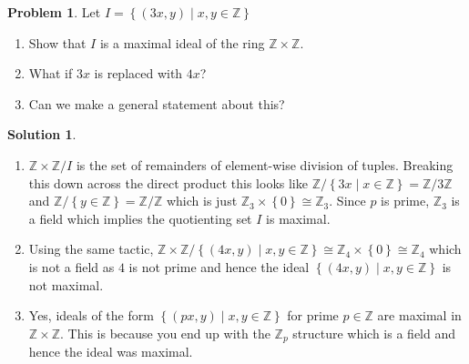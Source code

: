 \documentclass[10pt]{article}
\theoremstyle{definition}
\newtheorem{problem}{Problem}
\newtheorem{soln}{Solution}
\begin{document}
\begin{problem} Let
$I = \left\{(3x, y)\mid x,y \in\mathbb{Z}\right\}$
\begin{enumerate}[label=(\alph*)]
  \item Show that $I$ is a maximal ideal of the ring $\mathbb{Z}\times \mathbb{Z}$.
  \item What if $3x$ is replaced with $4x$?
  \item Can we make a general statement about this?
\end{enumerate}
\end{problem}
\begin{soln}~
  \begin{enumerate}[label=(\alph*)]
    \item $\mathbb{Z}\times \mathbb{Z}/I$ is the set of remainders of element-wise division of tuples. Breaking this down across the direct product
          this looks like $\mathbb{Z}/\left\{3x\mid x\in\mathbb{Z}\right\}=\mathbb{Z}/3\mathbb{Z}$ and $\mathbb{Z}/\left\{y\in\mathbb{Z}\right\}=\mathbb{Z}/\mathbb{Z}$
          which is just $\mathbb{Z}_3\times \left\{0\right\}\cong \mathbb{Z}_3$. Since $p$ is prime, $\mathbb{Z}_3$ is a field which implies the quotienting
          set $I$ is maximal.
    \item Using the same tactic, $\mathbb{Z}\times \mathbb{Z}/\left\{(4x, y)\mid x,y\in\mathbb{Z}\right\}\cong \mathbb{Z}_4\times \left\{0\right\}\cong \mathbb{Z}_4$
          which is not a field as $4$ is not prime and hence the ideal $\left\{(4x, y)\mid x,y\in\mathbb{Z}\right\}$ is not maximal.
    \item Yes, ideals of the form $\left\{(px, y)\mid x,y \in\mathbb{Z}\right\}$ for prime $p\in\mathbb{Z}$ are maximal in
          $\mathbb{Z}\times \mathbb{Z}$. This is because you end up with the $\mathbb{Z}_p$ structure which is a field and hence the ideal was maximal.
  \end{enumerate}
\end{soln}
\newpage
\end{document}

